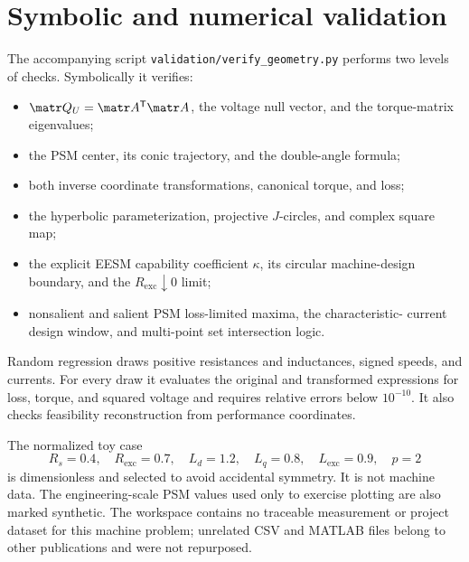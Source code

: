 \section{Symbolic and numerical validation}
\label{sec:validation}

The accompanying script \texttt{validation/verify\_geometry.py} performs two
levels of checks. Symbolically it verifies:
\begin{itemize}
 \item \(\matr Q_U=\matr A^{\mathsf T}\matr A\), the voltage null vector,
       and the torque-matrix eigenvalues;
 \item the PSM center, its conic trajectory, and the double-angle formula;
 \item both inverse coordinate transformations, canonical torque, and loss;
 \item the hyperbolic parameterization, projective \(J\)-circles, and complex
       square map;
 \item the explicit EESM capability coefficient \(\kappa\), its circular
       machine-design boundary, and the \(R_{\mathrm{exc}}\downarrow0\) limit;
 \item nonsalient and salient PSM loss-limited maxima, the characteristic-
       current design window, and multi-point set intersection logic.
\end{itemize}
Random regression draws positive resistances and inductances, signed speeds,
and currents. For every draw it evaluates the original and transformed
expressions for loss, torque, and squared voltage and requires relative errors
below \(10^{-10}\). It also checks feasibility reconstruction from performance
coordinates.

The normalized toy case
\begin{equation}
 R_s=0.4,\quad R_{\mathrm{exc}}=0.7,\quad L_d=1.2,\quad L_q=0.8,
 \quad L_{\mathrm{exc}}=0.9,\quad p=2
 \label{eq:toy-case}
\end{equation}
is dimensionless and selected to avoid accidental symmetry. It is not machine
data. The engineering-scale PSM values used only to exercise plotting are also
marked synthetic. The workspace contains no traceable measurement or project
dataset for this machine problem; unrelated CSV and MATLAB files belong to
other publications and were not repurposed.

